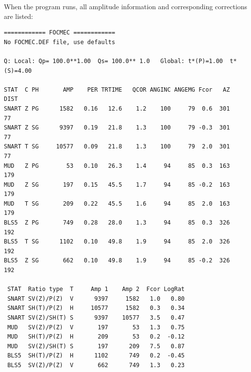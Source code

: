 
When the program runs, all amplitude information and corresponding corrections are listed:

\begin{verbatim}
============ FOCMEC ============
No FOCMEC.DEF file, use defaults

Q: Local: Qp= 100.0**1.00  Qs= 100.0** 1.0   Global: t*(P)=1.00  t*(S)=4.00

STAT  C PH       AMP    PER TRTIME   QCOR ANGINC ANGEMG Fcor   AZ  DIST
SNART Z PG      1582   0.16   12.6    1.2    100     79  0.6  301    77
SNART Z SG      9397   0.19   21.8    1.3    100     79 -0.3  301    77
SNART T SG     10577   0.09   21.8    1.3    100     79  2.0  301    77
MUD   Z PG        53   0.10   26.3    1.4     94     85  0.3  163   179
MUD   Z SG       197   0.15   45.5    1.7     94     85 -0.2  163   179
MUD   T SG       209   0.22   45.5    1.6     94     85  2.0  163   179
BLS5  Z PG       749   0.28   28.0    1.3     94     85  0.3  326   192
BLS5  T SG      1102   0.10   49.8    1.9     94     85  2.0  326   192
BLS5  Z SG       662   0.10   49.8    1.9     94     85 -0.2  326   192

 STAT  Ratio type  T     Amp 1    Amp 2  Fcor LogRat
 SNART SV(Z)/P(Z)  V      9397     1582   1.0   0.80
 SNART SH(T)/P(Z)  H     10577     1582   0.3   0.34
 SNART SV(Z)/SH(T) S      9397    10577   3.5   0.47
 MUD   SV(Z)/P(Z)  V       197       53   1.3   0.75
 MUD   SH(T)/P(Z)  H       209       53   0.2  -0.12
 MUD   SV(Z)/SH(T) S       197      209   7.5   0.87
 BLS5  SH(T)/P(Z)  H      1102      749   0.2  -0.45
 BLS5  SV(Z)/P(Z)  V       662      749   1.3   0.23
\end{verbatim}



